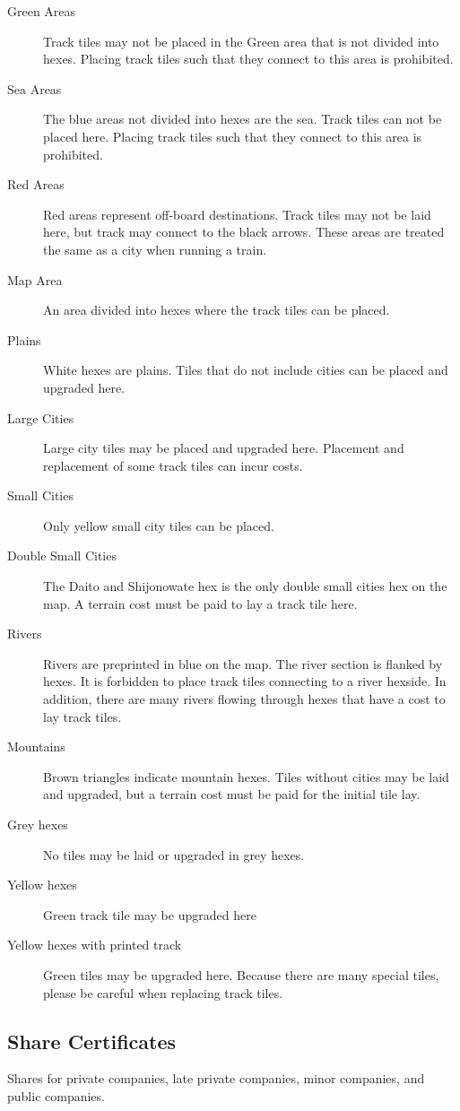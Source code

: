 \documentclass{article}
\begin{document}
\begin{CJK}{UTF8}{min}
\begin{multicols}{2}
\begin{description}
\item[Green Areas] Track tiles may not be placed in the Green area
  that is not divided into hexes. Placing track tiles such
  that they connect to this area is prohibited.
\item[Sea Areas] The blue areas not divided into hexes are the
  sea. Track tiles can not be placed here. Placing track
  tiles such that they connect to this area is prohibited.
\item[Red Areas] Red areas represent off-board destinations. Track
  tiles may not be laid here, but track may connect to the black
  arrows. These areas are treated the same as a city when running a
  train.
\item[Map Area] An area divided into hexes where the track
  tiles can be placed.
\item[Plains] White hexes are plains. Tiles that do not include cities
  can be placed and upgraded here.
\item[Large Cities] Large city tiles may be placed and upgraded
  here. Placement and replacement of some track tiles can incur costs.
\item[Small Cities] Only yellow small city tiles can be placed.
\item[Double Small Cities] The Daito and Shijonowate hex is the only
  double small cities hex on the map. A terrain cost must be paid to
  lay a track tile here.
\item[Rivers] Rivers are preprinted in blue on the map. The river
  section is flanked by hexes. It is forbidden to place track tiles
  connecting to a river hexside. In addition, there are many rivers flowing
  through hexes that have a cost to lay track tiles.
\item[Mountains] Brown triangles indicate mountain hexes. Tiles
  without cities may be laid and upgraded, but a terrain cost must be
  paid for the initial tile lay.
\item[Grey hexes] No tiles may be laid or upgraded in grey hexes.
\item[Yellow hexes] Green track tile may be upgraded here
\item[Yellow hexes with printed track] Green tiles may be upgraded
  here. Because there are many special tiles, please be careful when
  replacing track tiles.
\end{description}


\subsection{Share Certificates}
Shares for private companies, late private companies, minor companies, and
public companies.



\end{multicols}
\end{CJK}
\end{document}
